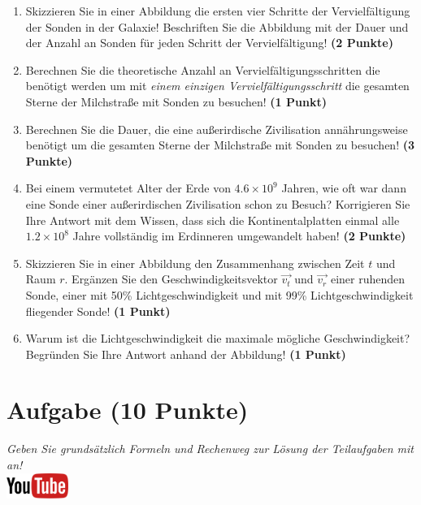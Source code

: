 \documentclass[a4paper, 9pt]{scrartcl}\usepackage[]{graphicx}\usepackage[]{xcolor}
\begin{document}
\begin{enumerate}
\item Skizzieren Sie in einer Abbildung die ersten vier Schritte der
  Vervielf{\"a}ltigung der Sonden in der Galaxie! Beschriften Sie die Abbildung
  mit der Dauer und der Anzahl an Sonden f{\"u}r jeden Schritt der Vervielf{\"a}ltigung! \textbf{(2 Punkte)}
\item Berechnen Sie die theoretische Anzahl an Vervielf{\"a}ltigungsschritten die
  ben{\"o}tigt werden um mit \textit{einem einzigen Vervielf{\"a}ltigungsschritt} die
  gesamten Sterne der Milchstra{\ss}e mit Sonden zu besuchen! \textbf{(1 Punkt)}
\item Berechnen Sie die Dauer, die eine au{\ss}erirdische Zivilisation
  ann{\"a}hrungsweise ben{\"o}tigt um die gesamten Sterne der Milchstra{\ss}e mit
  Sonden zu besuchen! \textbf{(3 Punkte)}
\item Bei einem vermutetet Alter der Erde von $\ensuremath{4.6\times 10^{9}}$ Jahren,
  wie oft war dann eine Sonde einer au{\ss}erirdischen Zivilisation schon zu
  Besuch? Korrigieren Sie Ihre Antwort mit dem Wissen, dass sich die
  Kontinentalplatten einmal alle $\ensuremath{1.2\times 10^{8}}$ Jahre vollst{\"a}ndig im
  Erdinneren umgewandelt haben! \textbf{(2 Punkte)}
\item Skizzieren Sie in einer Abbildung den Zusammenhang zwischen Zeit $t$
  und Raum $r$. Erg{\"a}nzen Sie den Geschwindigkeitsvektor $\vec{v_t}$ und
  $\vec{v_r}$ einer ruhenden Sonde, einer mit 50\% Lichtgeschwindigkeit und
  mit 99\% Lichtgeschwindigkeit fliegender Sonde! \textbf{(1 Punkt)}
\item Warum ist die Lichtgeschwindigkeit die maximale m{\"o}gliche Geschwindigkeit?
Begr{\"u}nden Sie Ihre Antwort anhand der Abbildung!  \textbf{(1 Punkt)}
\end{enumerate}


 
\clearpage

\section{Aufgabe \hfill (10 Punkte)}

\textit{Geben Sie grunds{\"a}tzlich Formeln und Rechenweg zur L{\"o}sung der
  Teilaufgaben mit an!} \\[1Ex]

\hfill\href{https://youtu.be/aBxLkdF-c4M}{\includegraphics[width =
  2cm]{img/youtube}} %
\hspace{2Ex}
\end{document}
